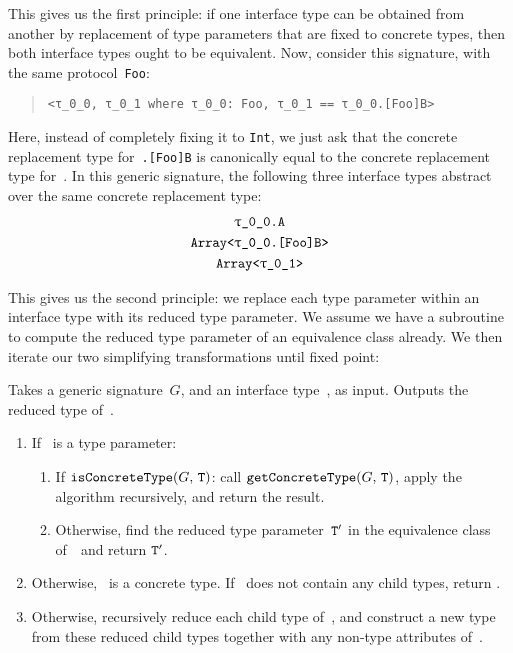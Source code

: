 \documentclass[../generics]{subfiles}
\begin{document}
This gives us the first principle: if one interface type can be obtained from another by replacement of type parameters that are fixed to concrete types, then both interface types ought to be equivalent. Now, consider this signature, with the same protocol~\texttt{Foo}:
\begin{quote}
\begin{verbatim}
<τ_0_0, τ_0_1 where τ_0_0: Foo, τ_0_1 == τ_0_0.[Foo]B>
\end{verbatim}
\end{quote}
Here, instead of completely fixing it to \texttt{Int}, we just ask that the concrete replacement type for~\texttt{\rT.[Foo]B} is canonically equal to the concrete replacement type for~\rU. In this generic signature, the following three interface types abstract over the same concrete replacement type:
\begin{gather*}
\texttt{\rT.A}\\
\texttt{Array<\rT.[Foo]B>}\\
\texttt{Array<\rU>}
\end{gather*}

This gives us the second principle: we replace each type parameter within an interface type with its reduced type parameter. We assume we have a subroutine to compute the reduced type parameter of an equivalence class already. We then iterate our two simplifying transformations until fixed point:

\begin{algorithm}\label{reduced type algorithm}
Takes a generic signature~$G$, and an interface type~\tT, as input. Outputs the reduced type of~\tT.
\begin{enumerate}
\item If \tT\ is a type parameter:
\begin{enumerate}
\item If $\texttt{isConcreteType}(G,\,\texttt{T})$: call $\texttt{getConcreteType}(G,\,\texttt{T})$, apply the algorithm recursively, and return the result.
\item Otherwise, find the reduced type parameter~$\texttt{T}^\prime$ in the equivalence class of~\tT\ and return $\texttt{T}^\prime$.
\end{enumerate}
\item Otherwise, \tT\ is a concrete type. If \tT\ does not contain any child types, return \tT.
\item Otherwise, recursively reduce each child type of~\tT, and construct a new type from these reduced child types together with any non-type attributes of~\tT.
\end{enumerate}
\end{algorithm}
\end{document}
